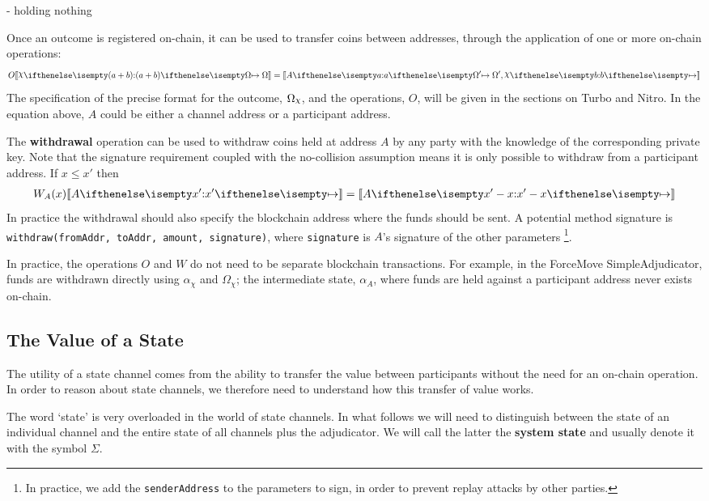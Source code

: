 \documentclass{article}
\begin{document}
- holding nothing

Once an outcome is registered on-chain, it can be used to transfer coins between addresses,
through the application of one or more on-chain operations:
\begin{align*}
  O \adj{\holds{\rchi}{(a + b)}{\Omega}} = \adj{\holds{A}{a}{\Omega'
}, \holds{\rchi}{b}{}}
\end{align*}
The specification of the precise format for the outcome, $\Omega_\rchi$, and the operations, $O$,
will be given in the sections on Turbo and Nitro.
In the equation above, $A$ could be either a channel address or a participant address.

The \textbf{withdrawal} operation can be used to withdraw coins held at address $A$ by any
party with the knowledge of the corresponding private key. 
Note that the signature requirement coupled with the no-collision assumption means
it is only possible to withdraw from a participant address.
If $x \leq x'$ then
\begin{align*}
W_A(x) \adj{\holds{A}{x'}{}} = \adj{\holds{A}{x'-x}{}}
\end{align*}
In practice the withdrawal should also specify the blockchain address where the funds should be sent.
A potential method signature is \texttt{withdraw(fromAddr, toAddr, amount, signature)}, 
where \texttt{signature} is $A$'s signature of the other parameters
\footnote{In practice, we add the \texttt{senderAddress} to the parameters to sign,
in order to prevent replay attacks by other parties.}.

In practice, the operations $O$ and $W$ do not need to be separate blockchain transactions.
For example, in the ForceMove SimpleAdjudicator, funds are withdrawn directly using $\alpha_\chi$ and $\Omega_\chi$;
the intermediate state, $\alpha_A$, where funds are held against a participant address never exists on-chain.

\subsection{The Value of a State}\label{section:value-of-a-state}

The utility of a state channel comes from the ability to transfer the value
between participants without the need for an on-chain operation.
In order to reason about state channels, we therefore need to understand how this transfer
of value works.

The word `state' is very overloaded in the world of state channels.
In what follows we will need to distinguish between the state of an individual channel and
the entire state of all channels plus the adjudicator.
We will call the latter the \textbf{system state} and usually denote it with the symbol $\Sigma$.
\end{document}

